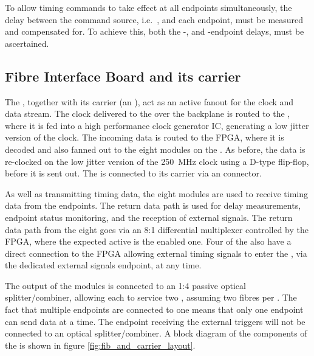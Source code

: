 \documentclass{dune}
\begin{document}
To allow timing commands to take effect at all endpoints simultaneously, the delay between the command source, i.e.\ , and each endpoint, must be measured and compensated for. To achieve this, both the -, and -endpoint delays, must be ascertained.

\subsection{Fibre Interface Board and its carrier}
The , together with its carrier (an ), act as an active fanout for the  clock and data stream. The clock delivered to the  over the  backplane is routed to the , where it is fed into a high performance clock generator IC, generating a low jitter version of the clock. The incoming data is routed to the  FPGA, where it is decoded and also fanned out to the eight  modules on the . As before, the  data is re-clocked on the low jitter version of the \SI{250}{\MHz} clock using a D-type flip-flop, before it is sent out. The  is connected to its  carrier via an  connector.

As well as transmitting timing data, the eight  modules are used to receive timing data from the endpoints. The return data path is used for delay measurements, endpoint status monitoring, and the reception of external signals. The return data path from the eight  goes via an 8:1 differential multiplexer controlled by the  FPGA, where the expected active  is the enabled one. Four of the  also have a direct connection to the  FPGA allowing external timing signals to enter the , via the dedicated external signals endpoint, at any time.

The output of the  modules is connected to an 1:4 passive optical splitter/combiner, allowing each  to service two , assuming two fibres per . The fact that multiple endpoints are connected to one  means that only one endpoint can send  data at a time. The endpoint receiving the external triggers will not be connected to an optical splitter/combiner. A block diagram of the components of the  is shown in figure \ref{fig:fib_and_carrier_layout}.
\end{document}
